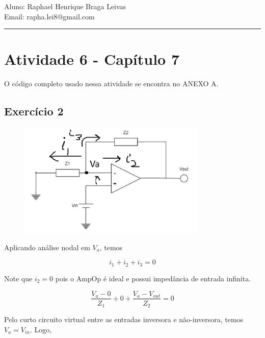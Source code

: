 \documentclass[12pt]{scrartcl}
\makeatletter
\def\today{%
  \two@digits{\the\day}/%
  \ifcase\month\or%
  01\or 02\or 03\or 04\or 05\or 06\or%
  07\or 08\or 09\or 10\or 11\or 12\fi/%
  \number\year%
}
\makeatother
\begin{document}
\pagestyle{fancy}

\fancyhead{}
\fancyhead[R]{Data: \today}
\fancyfoot{}

\begin{center}
    Aluno: Raphael Henrique Braga Leivas \\[20pt]
    Email: rapha.lei8@gmail.com
\end{center}

\hrule

\section*{Atividade 6 - Capítulo 7}

O código completo usado nessa atividade se encontra no ANEXO A.

\subsection*{Exercício 2}

\begin{figure}[htp!]
	\begin{center}
    \includegraphics[width=0.8\textwidth,trim=1 1 1 1,clip]{ex2.png}
	\end{center}
\end{figure}

Aplicando análise nodal em $V_a$, temos

\[ i_1 + i_2 + i_3 = 0  \]

Note que $i_2 = 0$ pois o AmpOp é ideal e possui impedância de entrada infinita.

\[ \frac{V_a - 0}{Z_1} + 0 + \frac{V_a - V_{out}}{Z_2} = 0  \]

Pelo curto circuito virtual entre as entradas inversora e não-inversora, temos $V_a = V_{in}$. Logo,
\end{document}
